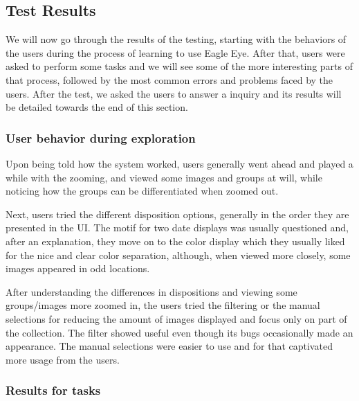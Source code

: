 {\subsection{Test Results}

We will now go through the results of the testing, starting with the behaviors of the users during the process of learning to use Eagle Eye. After that, users were asked to perform some tasks and we will see some of the more interesting parts of that process, followed by the most common errors and problems faced by the users. After the test, we asked the users to answer a inquiry and its results will be detailed towards the end of this section.






\subsubsection{User behavior during exploration}

Upon being told how the system worked, users generally went ahead and played a while with the zooming, and viewed some images and groups at will, while noticing how the groups can be differentiated when zoomed out.

Next, users tried the different disposition options, generally in the order they are presented in the \ac{UI}. The motif for two date displays was usually questioned and, after an explanation, they move on to the color display which they usually liked for the nice and clear color separation, although, when viewed more closely, some images appeared in odd locations.

After understanding the differences in dispositions and viewing some groups/images more zoomed in, the users tried the filtering or the manual selections for reducing the amount of images displayed and focus only on part of the collection. The filter showed useful even though its bugs occasionally made an appearance. The manual selections were easier to use and for that captivated more usage from the users.





\subsubsection{Results for tasks}

}
